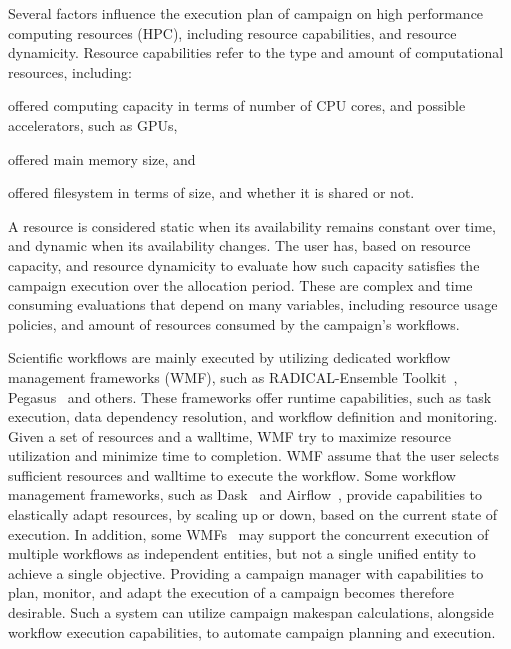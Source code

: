 Several factors influence the execution plan of campaign on high performance computing resources (HPC), including resource capabilities, and resource dynamicity.
Resource capabilities refer to the type and amount of computational resources, including: 
\begin{inparaenum}[1)]
\item offered computing capacity in terms of number of CPU cores, and possible accelerators, such as GPUs,
\item offered main memory size, and
\item offered filesystem in terms of size, and whether it is shared or not.
\end{inparaenum}
A resource is considered static when its availability remains constant over time, and dynamic when its availability changes.
The user has, based on resource capacity, and resource dynamicity to evaluate how such capacity satisfies the campaign execution over the allocation period.
These are complex and time consuming evaluations that depend on many variables, including resource usage policies, and amount of resources consumed by the campaign’s workflows.

Scientific workflows are mainly executed by utilizing dedicated workflow management frameworks (WMF), such as RADICAL-Ensemble Toolkit~\cite{balasubramanian2018harnessing}, Pegasus~\cite{deelman2015pegasus} and others.
These frameworks offer runtime capabilities, such as task execution, data dependency resolution, and workflow definition and monitoring.
Given a set of resources and a walltime, WMF try to maximize resource utilization and minimize time to completion.
WMF assume that the user selects sufficient resources and walltime to execute the workflow.
Some workflow management frameworks, such as Dask~\cite{rocklin2015dask} and Airflow~\cite{airflow}, provide capabilities to elastically adapt resources, by scaling up or down, based on the current state of execution.
In addition, some  WMFs~\cite{deelman2015pegasus} may support the concurrent execution of multiple workflows as independent entities, but not a single unified entity to achieve a single objective.
Providing a campaign manager with capabilities to plan, monitor, and adapt the execution of a campaign becomes therefore desirable.
Such a system can utilize campaign makespan calculations, alongside workflow execution capabilities, to automate campaign planning and execution. 

